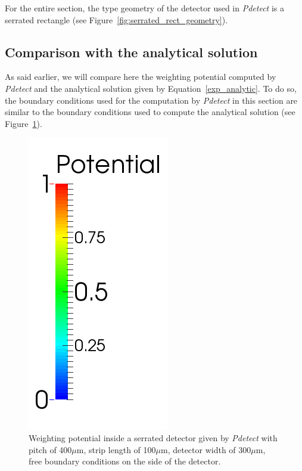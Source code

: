\documentclass[11pt]{article}
\begin{document}
	For the entire section, the type geometry of the detector used in \textit{Pdetect} is a
	serrated rectangle (see Figure~\ref{fig:serrated_rect_geometry}).

	\subsection{Comparison with the analytical solution} \label{comparisons}

		As said earlier, we will compare here the weighting potential computed by \textit{Pdetect} and
		the analytical solution given by Equation~\ref{exp_analytic}.
		To do so, the boundary conditions used for the computation by \textit{Pdetect} in this section
		are similar to the boundary conditions used to compute the analytical solution (see
		Figure~\ref{fig:w_semi_free_conditions}).

		\begin{figure}[H]
			\begin{minipage}[b]{.60\linewidth}
			\end{minipage}
			\begin{minipage}[b]{.46\linewidth}
				\center
				\includegraphics[scale=0.45]{images/boundary_conditions/detector/graduation.png}
			\end{minipage}
			\caption{Weighting potential inside a serrated detector given by \textit{Pdetect} with pitch
					of 400$\mu$m, strip length of 100$\mu$m, detector width of 300$\mu$m, free boundary conditions
					on the side of the detector.}
			\label{fig:w_semi_free_conditions}
		\end{figure}
\end{document}

